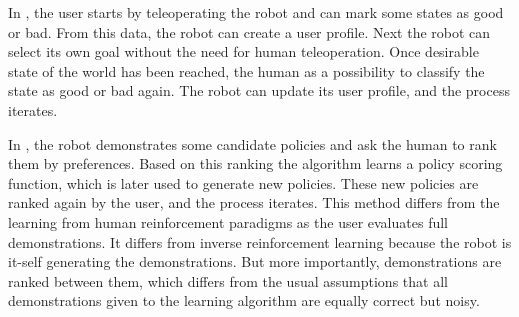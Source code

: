 In \cite{Mason2011}, the user starts by teleoperating the robot and can mark some states as good or bad. From this data, the robot can create a user profile. Next the robot can select its own goal without the need for human teleoperation. Once desirable state of the world has been reached, the human as a possibility to classify the state as good or bad again. The robot can update its user profile, and the process iterates.


In \cite{akrour2011preference,akrour2012april,akrour2014programming,wilson2012bayesian}, the robot demonstrates some candidate policies and ask the human to rank them by preferences. Based on this ranking the algorithm learns a policy scoring function, which is later used to generate new policies. These new policies are ranked again by the user, and the process iterates. This method differs from the learning from human reinforcement paradigms as the user evaluates full demonstrations. It differs from inverse reinforcement learning because the robot is it-self generating the demonstrations. But more importantly, demonstrations are ranked between them, which differs from the usual assumptions that all demonstrations given to the learning algorithm are equally correct but noisy.



